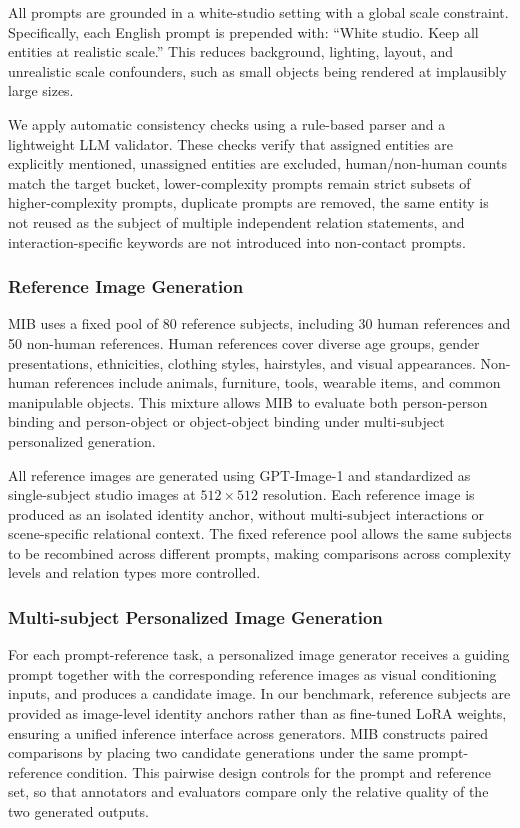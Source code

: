 All prompts are grounded in a white-studio setting with a global scale constraint. Specifically, each English prompt is prepended with: ``White studio. Keep all entities at realistic scale.'' This reduces background, lighting, layout, and unrealistic scale confounders, such as small objects being rendered at implausibly large sizes.

We apply automatic consistency checks using a rule-based parser and a lightweight LLM validator. These checks verify that assigned entities are explicitly mentioned, unassigned entities are excluded, human/non-human counts match the target bucket, lower-complexity prompts remain strict subsets of higher-complexity prompts, duplicate prompts are removed, the same entity is not reused as the subject of multiple independent relation statements, and interaction-specific keywords are not introduced into non-contact prompts.

\subsubsection{Reference Image Generation}

MIB uses a fixed pool of 80 reference subjects, including 30 human references and 50 non-human references. Human references cover diverse age groups, gender presentations, ethnicities, clothing styles, hairstyles, and visual appearances. Non-human references include animals, furniture, tools, wearable items, and common manipulable objects. This mixture allows MIB to evaluate both person-person binding and person-object or object-object binding under multi-subject personalized generation.

All reference images are generated using GPT-Image-1 and standardized as single-subject studio images at $512 \times 512$ resolution. Each reference image is produced as an isolated identity anchor, without multi-subject interactions or scene-specific relational context. The fixed reference pool allows the same subjects to be recombined across different prompts, making comparisons across complexity levels and relation types more controlled.


\subsubsection{Multi-subject Personalized Image Generation}

For each prompt-reference task, a personalized image generator receives a guiding prompt together with the corresponding reference images as visual conditioning inputs, and produces a candidate image. In our benchmark, reference subjects are provided as image-level identity anchors rather than as fine-tuned LoRA weights, ensuring a unified inference interface across generators. MIB constructs paired comparisons by placing two candidate generations under the same prompt-reference condition. This pairwise design controls for the prompt and reference set, so that annotators and evaluators compare only the relative quality of the two generated outputs.

